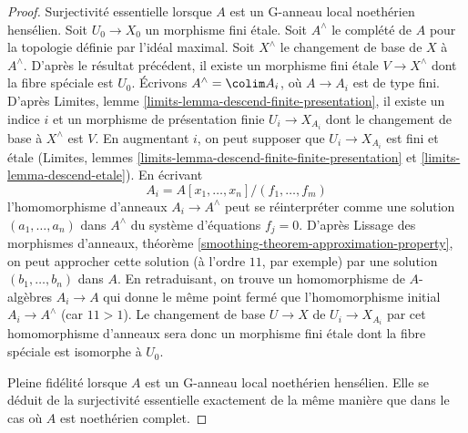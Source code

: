 \begin{proof}
\medskip\noindent
Surjectivité essentielle lorsque $A$ est un G-anneau local noethérien hensélien.
Soit $U_0 \to X_0$ un morphisme fini étale.
Soit $A^\wedge$ le complété de $A$ pour la topologie définie par l'idéal maximal.
Soit $X^\wedge$ le changement de base de $X$ à $A^\wedge$.
D'après le résultat précédent, il existe un morphisme fini étale
$V \to X^\wedge$ dont la fibre spéciale est $U_0$.
Écrivons $A^\wedge = \colim A_i$, où $A \to A_i$ est de type fini.
D'après Limites, lemme \ref{limits-lemma-descend-finite-presentation},
il existe un indice $i$ et un morphisme de présentation finie $U_i \to X_{A_i}$
dont le changement de base à $X^\wedge$ est $V$. En augmentant $i$,
on peut supposer que $U_i \to X_{A_i}$ est fini et étale
(Limites, lemmes \ref{limits-lemma-descend-finite-finite-presentation} et
\ref{limits-lemma-descend-etale}). En écrivant
$$
A_i = A[x_1, \ldots, x_n]/(f_1, \ldots, f_m)
$$
l'homomorphisme d'anneaux $A_i \to A^\wedge$ peut se réinterpréter comme une solution
$(a_1, \ldots, a_n)$ dans $A^\wedge$ du système d'équations $f_j = 0$.
D'après Lissage des morphismes d'anneaux, théorème \ref{smoothing-theorem-approximation-property},
on peut approcher cette solution (à l'ordre $11$, par exemple) par une solution
$(b_1, \ldots, b_n)$ dans $A$. En retraduisant, on trouve un homomorphisme de $A$-algèbres
$A_i \to A$ qui donne le même point fermé que l'homomorphisme initial
$A_i \to A^\wedge$ (car $11 > 1$). Le changement de base $U \to X$ de $U_i \to X_{A_i}$
par cet homomorphisme d'anneaux sera donc un morphisme fini étale dont la
fibre spéciale est isomorphe à $U_0$.

\medskip\noindent
Pleine fidélité lorsque $A$ est un G-anneau local noethérien hensélien.
Elle se déduit de la surjectivité essentielle exactement de la même
manière que dans le cas où $A$ est noethérien complet.


\end{proof}
